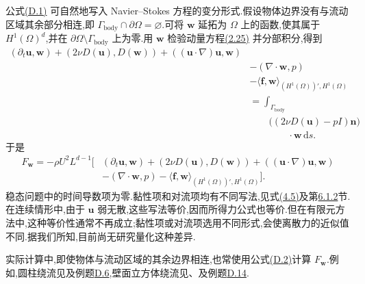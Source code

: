 \begin{note}[流动作用于物体的力]
公式\hyperref[eq:appendix-d-1]{(D.1)} 可自然地写入 Navier--Stokes 方程的变分形式.假设物体边界没有与流动区域其余部分相连,即 $\Gamma_{\mathrm{body}}\cap\partial\Omega=\varnothing$.可将 $\bm w$ 延拓为 $\Omega$ 上的函数,使其属于 $H^1(\Omega)^d$,并在 $\partial\Omega\setminus\Gamma_{\mathrm{body}}$ 上为零.用 $\bm w$ 检验动量方程\hyperref[eq:dimensionless-ns-standard]{(2.25)} 并分部积分,得到
\[
\begin{aligned}
 (\partial_t\bm u,\bm w)
 +(2\nu D(\bm u),D(\bm w))
 +((\bm u\cdot\nabla)\bm u,\bm w)\\
 &-(\nabla\cdot\bm w,p)\\
 &-\langle\bm f,\bm w\rangle_{(H^1(\Omega))',H^1(\Omega)}\\
 &=\int_{\Gamma_{\mathrm{body}}}\\
 &\qquad\bigl((2\nu D(\bm u)-pI)\bm n\bigr)\\
 &\qquad\qquad\cdot\bm w\,\mathrm ds .
\end{aligned}
\]
于是
\begin{equation}\label{eq:appendix-d-2}
\begin{aligned}
F_{\bm w}=-\rho U^2L^{d-1}\bigl[
 &(\partial_t\bm u,\bm w)
 +(2\nu D(\bm u),D(\bm w))
 +((\bm u\cdot\nabla)\bm u,\bm w)\\
 &-(\nabla\cdot\bm w,p)
 -\langle\bm f,\bm w\rangle_{(H^1(\Omega))',H^1(\Omega)}
\bigr].
\end{aligned}
\end{equation}
稳态问题中的时间导数项为零.黏性项和对流项均有不同写法,见式\hyperref[eq:stokes-deformation-tensor-form]{(4.5)}及第\hyperref[subsec:steady-ns-nonlinear-term]{6.1.2}节.在连续情形中,由于 $\bm u$ 弱无散,这些写法等价,因而所得力公式也等价.但在有限元方法中,这种等价性通常不再成立;黏性项或对流项选用不同形式,会使离散力的近似值不同.据我们所知,目前尚无研究量化这种差异.

实际计算中,即使物体与流动区域的其余边界相连,也常使用公式\hyperref[eq:appendix-d-2]{(D.2)}计算 $F_{\bm w}$.例如,圆柱绕流见\textcite{John2002}及例题\hyperref[ex:appendix-d-6]{D.6},壁面立方体绕流见\textcite{Hoffman2005}、\textcite{HoffmanJohnson2006}及例题\hyperref[ex:appendix-d-14]{D.14}.


\end{note}
